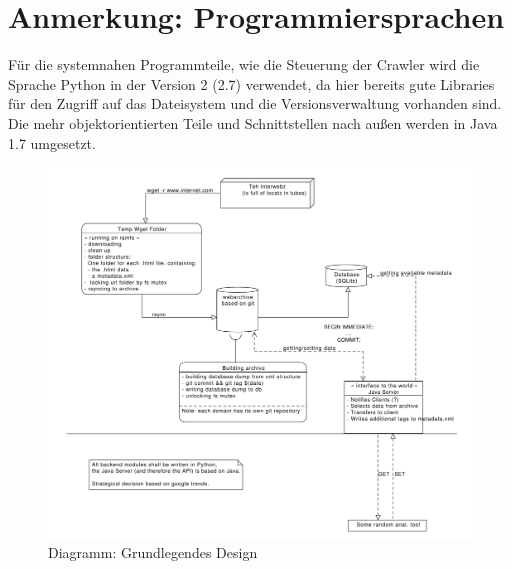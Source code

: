 \section{Anmerkung: Programmiersprachen}
Für die systemnahen Programmteile, wie die Steuerung der Crawler wird die Sprache Python in der Version 2 (2.7) verwendet,
da hier bereits gute Libraries für den Zugriff auf das Dateisystem und die Versionsverwaltung vorhanden sind.
Die mehr objektorientierten Teile und Schnittstellen nach außen werden in Java 1.7 umgesetzt.
\newpage 

\begin{figure}
	\centering
	\includegraphics[width=\textwidth]{spezi/webarchiv_design.pdf}
	\caption{Diagramm: Grundlegendes Design}
\end{figure}
 
